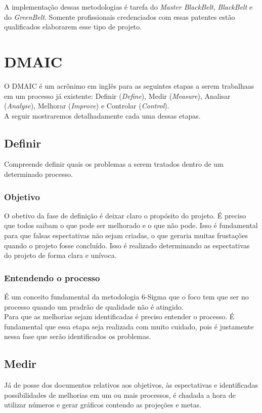\documentclass{abnt}
\begin{document}
			 A implementação dessas metodologias é tarefa do \textit{Master BlackBelt}, \textit{BlackBelt} e do \textit{GreenBelt}. Somente profissionais 
			 credenciados com essas patentes estão qualificados elaborarem esse tipo de projeto.
			 
			\section {DMAIC}
				O DMAIC é um acrônimo em inglês para as seguintes etapas a serem trabalhaas em 
				um processo já existente: Definir (\textit{Define}), Medir (\textit{Measure}), 
				Analisar (\textit{Analyse}), Melhorar (\textit{Improve}) e Controlar (\textit{Control}).
				\\
				A seguir mostraremos detalhadamente cada uma dessas etapas.
				
				\subsection {Definir}
					Compreende definir quais os problemas a serem tratados dentro de um determinado processo.
					\subsubsection {Objetivo}
					O obetivo da fase de definição é deixar claro o propósito do projeto. É preciso que todos
					saibam o que pode ser melhorado e o que não pode. Isso é fundamental para que falsas espectativas 
					não sejam criadas, o que geraria muitas frustações quando o projeto fosse concluído. Isso é 
					realizado determinando as espectativas do projeto de forma clara e unívoca.
					\subsubsection {Entendendo o processo}
					É um conceito fundamental da metodologia 6-Sigma que o foco tem que ser no processo
					quando um pradrão de qualidade não é atingido.\\
					Para que as melhorias sejam identificadas é preciso entender o processo.  
					É fundamental que essa etapa seja realizada com muito cuidado, pois é justamente nessa
					fase que serão identificados os problemas.
				\subsection {Medir}
					Já de posse dos documentos relativos aos objetivos, às espectativas e identificadas 
					possibilidades de melhorias em um ou mais processos, é chadada a hora de utilizar números 
					e gerar gráficos contendo as projeções e metas.
\end{document}
